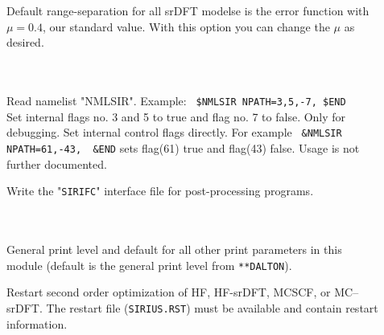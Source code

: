 \begin{description}

\item[] \ \\
   \\
  Default range-separation for all srDFT modelse is the error function with $\mu = 0.4$, our standard value.
  With this option you can change the $\mu$ as desired.

\item[] \ \\
   \\
  Read namelist "NMLSIR". Example: \verb" $NMLSIR NPATH=3,5,-7, $END" \\
  Set internal flags no. 3 and 5 to true and flag no. 7 to false.
  Only for debugging. Set internal control flags directly.
  For example  \verb" &NMLSIR NPATH=61,-43,  &END" sets flag(61) true and flag(43) false.
  Usage is not further documented.

\item[]
  Write the "\verb|SIRIFC|" interface file for post-processing programs.


\item[] \ \\
   \\
  General {\sir} print level and default for all other print parameters in this module
  (default is the general print level from \verb|**DALTON|).

\item[]
  Restart {\sir} second order optimization of HF, HF-srDFT, MCSCF, or MC--srDFT.
  The {\sir} restart file (\verb|SIRIUS.RST|) must be available and contain restart information.



\end{description}
